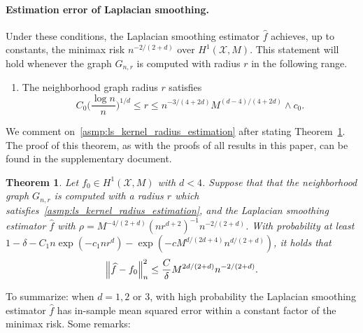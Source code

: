 \documentclass[twoside]{article}
\newcommand{\1}{\mathbf{1}}
\newcommand{\Xset}{\mathcal{X}}
\newcommand{\wh}[1]{\widehat{#1}}
\newtheorem{theorem}{Theorem}
\theoremstyle{definition}
\theoremstyle{remark}
\begin{document}
\paragraph{Estimation error of Laplacian smoothing.} 
Under these conditions, the Laplacian smoothing estimator $\wh{f}$ achieves, up to constants, the minimax risk $n^{-2/(2 + d)}$ over $H^1(\Xset,M)$. This statement will hold whenever the graph $G_{n,r}$ is computed with radius $r$ in the following range.
\begin{enumerate}[label=(R\arabic*)]
	\setcounter{enumi}{0}
	\item 
	\label{asmp:ls_kernel_radius_estimation}
	The neighborhood graph radius $r$ satisfies
	\begin{equation*}
	C_0\biggl(\frac{\log n}{n}\biggr)^{1/d} \leq r \leq n^{-3/(4 + 2d)} M^{(d - 4)/(4 + 2d)} \wedge c_0.
	\end{equation*}
\end{enumerate}
We comment on~\ref{asmp:ls_kernel_radius_estimation} after stating Theorem~\ref{thm:laplacian_smoothing_estimation1}. The proof of this theorem, as with the proofs of all results in this paper, can be found in the supplementary document.
\begin{theorem}
	\label{thm:laplacian_smoothing_estimation1}
	Let $f_0 \in H^1(\Xset,M)$ with $d < 4$. Suppose that that the neighborhood graph $G_{n,r}$ is computed with a radius $r$ which satisfies~\ref{asmp:ls_kernel_radius_estimation},  and the Laplacian smoothing estimator $\wh{f}$ with $\rho = M^{-4/(2 + d)} (nr^{d + 2})^{-1} n^{-2/(2 + d)}$. With probability at least $1 - \delta -  C_1n\exp(-c_1nr^d) - \exp(-c M^{d/(2d + 4)} n^{d/(2+d)})$, it holds that
	\begin{equation}
	\label{eqn:laplacian_smoothing_estimation1}
	\Bigl\|\wh{f} - f_0\Bigr\|_n^2 \leq \frac{C}{\delta} M^{2d/(2 + d)} n^{-2/(2 + d)}.
	\end{equation}
\end{theorem}
To summarize: when $d = 1,2$ or $3$, with high probability the Laplacian smoothing estimator $\wh{f}$ has in-sample mean squared error within a constant factor of the minimax risk. Some remarks:
\end{document}
